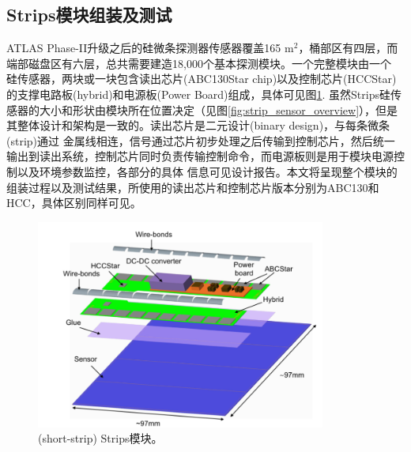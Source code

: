 \subsection{Strips模块组装及测试}
ATLAS Phase-II升级之后的硅微条探测器传感器覆盖165 m$^2$，桶部区有四层，而端部磁盘区有六层，总共需要建造18,000个基本探测模块。一个完整模块由一个
硅传感器，两块或一块包含读出芯片(ABC130Star chip)以及控制芯片(HCCStar)的支撑电路板(hybrid)和电源板(Power Board)组成，具体可见图\ref{fig:strips_module}.
虽然Strips硅传感器的大小和形状由模块所在位置决定（见图\ref{fig:strip_sensor_overview}），但是其整体设计和架构是一致的。读出芯片是二元设计(binary design)，与每条微条(strip)通过
金属线相连，信号通过芯片初步处理之后传输到控制芯片，然后统一输出到读出系统，控制芯片同时负责传输控制命令，而电源板则是用于模块电源控制以及环境参数监控，各部分的具体
信息可见设计报告\cite{Collaboration:2017mtb}。本文将呈现整个模块的组装过程以及测试结果，所使用的读出芯片和控制芯片版本分别为ABC130和HCC，具体区别同样可见\cite{Collaboration:2017mtb}。

\begin{figure}[h]
\centering
 \includegraphics[width=0.85\textwidth]{fig/strips_module_3d.png}
 \caption{(short-strip) Strips模块。}
 \label{fig:strips_module}
\end{figure}

